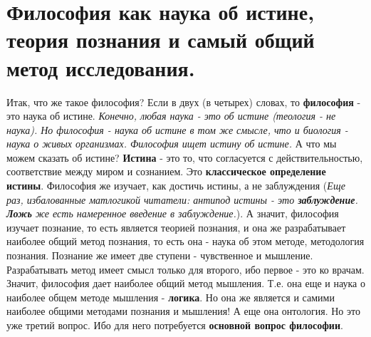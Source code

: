 \section{ Философия как наука об истине, теория познания и самый общий метод исследования.}
Итак, что же такое философия? Если в двух (в четырех) словах, то \textbf{философия} - это наука об истине. \textit{Конечно, любая наука - это об истине (теология - не наука). Но философия - наука об истине в том же смысле, что и биология - наука о живых организмах. Философия ищет истину об истине.} А что мы можем сказать об истине? \textbf{Истина} - это то, что согласуется с действительностью, соответствие между миром и сознанием. Это \textbf{классическое определение истины}. Философия же изучает, как достичь истины, а не заблуждения (\textit{Еще раз, избалованные матлогикой читатели: антипод истины - это \textbf{заблуждение}. \textbf{Ложь} же есть намеренное введение в заблуждение.}). А значит, философия изучает познание, то есть является теорией познания, и она же разрабатывает наиболее общий метод познания, то есть она - наука об этом методе, методология познания. Познание же имеет две ступени - чувственное и мышление. Разрабатывать метод имеет смысл только для второго, ибо первое - это ко врачам. Значит, философия дает наиболее общий метод мышления. Т.е. она еще и наука о наиболее общем методе мышления - \textbf{логика}. Но она же является и самими наиболее общими методами познания и мышления! А еще она онтология. Но это уже третий вопрос. Ибо для него потребуется \textbf{основной вопрос философии}.

